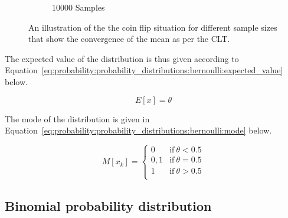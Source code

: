 \begin{figure}[htbp]
\begin{subfigure}{0.49\textwidth}
            \caption{10000 Samples}
            \label{fig:probability:probability_distributions:bernoulli:coin_10000}
      \end{subfigure}
      \par\bigskip
      \caption{An illustration of the the coin flip situation for different sample sizes that show the convergence of the mean as per the \acf{CLT}.}
      \label{fig:probability:probability_distributions:bernoulli:coin}
\end{figure}

The expected value of the distribution is thus given according to Equation~\eqref{eq:probability:probability_distributions:bernoulli:expected_value} below.

\begin{equation}
      \label{eq:probability:probability_distributions:bernoulli:expected_value}
      E[x] = \theta
\end{equation}

The mode of the distribution is given in Equation~\eqref{eq:probability:probability_distributions:bernoulli:mode} below.

\begin{equation}
      \label{eq:probability:probability_distributions:bernoulli:mode}
      M[x_{k}] =
      \begin{cases}
            0   & \text{if}\ \theta < 0.5 \\
            0,1 & \text{if}\ \theta = 0.5 \\
            1   & \text{if}\ \theta > 0.5 \\
      \end{cases}
\end{equation}


\subsection{Binomial probability distribution}\label{sec:probability:probability_distributions:bin}



